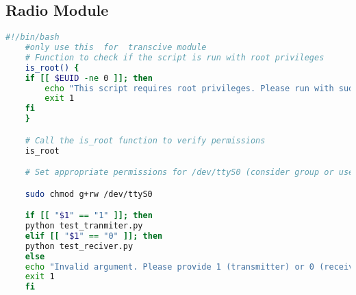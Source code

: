 \subsection{Radio Module}
\begin{lstlisting}[language=bash,caption={Code for the testing serial of the radio module}]
    #!/bin/bash
    #only use this  for  transcive module
    # Function to check if the script is run with root privileges
    is_root() {
    if [[ $EUID -ne 0 ]]; then
        echo "This script requires root privileges. Please run with sudo."
        exit 1
    fi
    }

    # Call the is_root function to verify permissions
    is_root

    # Set appropriate permissions for /dev/ttyS0 (consider group or user access)

    sudo chmod g+rw /dev/ttyS0

    if [[ "$1" == "1" ]]; then
    python test_tranmiter.py
    elif [[ "$1" == "0" ]]; then
    python test_reciver.py
    else
    echo "Invalid argument. Please provide 1 (transmitter) or 0 (receiver)."
    exit 1
    fi
\end{lstlisting}